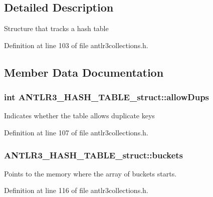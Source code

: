 \subsection{Detailed Description}
Structure that tracks a hash table 

Definition at line 103 of file antlr3collections.\-h.



\subsection{Member Data Documentation}
\hypertarget{struct_a_n_t_l_r3___h_a_s_h___t_a_b_l_e__struct_aaf47456b16dbdd1264fe4848bca47515}{
\subsubsection[{allow\-Dups}]{\setlength{\rightskip}{0pt plus 5cm}int A\-N\-T\-L\-R3\-\_\-\-H\-A\-S\-H\-\_\-\-T\-A\-B\-L\-E\-\_\-struct\-::allow\-Dups}}\label{struct_a_n_t_l_r3___h_a_s_h___t_a_b_l_e__struct_aaf47456b16dbdd1264fe4848bca47515}
Indicates whether the table allows duplicate keys 

Definition at line 107 of file antlr3collections.\-h.

\hypertarget{struct_a_n_t_l_r3___h_a_s_h___t_a_b_l_e__struct_a04189dd085126dbe5ebbae7c5643a041}{
\subsubsection[{buckets}]{ A\-N\-T\-L\-R3\-\_\-\-H\-A\-S\-H\-\_\-\-T\-A\-B\-L\-E\-\_\-struct\-::buckets}}\label{struct_a_n_t_l_r3___h_a_s_h___t_a_b_l_e__struct_a04189dd085126dbe5ebbae7c5643a041}
Points to the memory where the array of buckets starts. 

Definition at line 116 of file antlr3collections.\-h.

